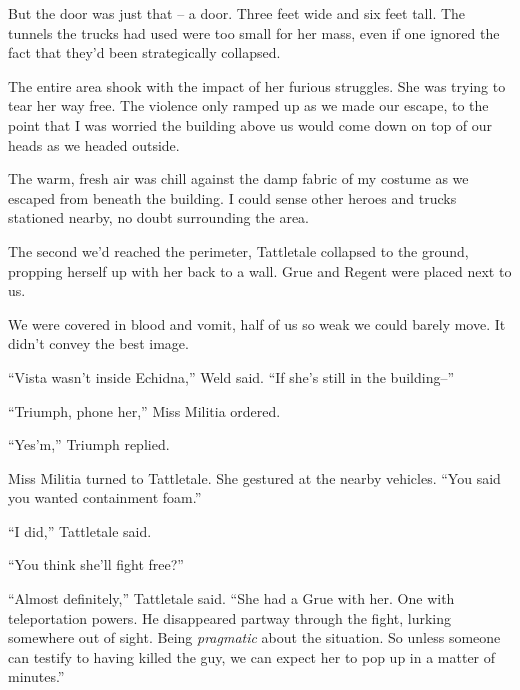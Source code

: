 But the door was just that – a door.  Three feet wide and six feet tall.  The tunnels the trucks had used were too small for her mass, even if one ignored the fact that they'd been strategically collapsed.



The entire area shook with the impact of her furious struggles.  She was trying to tear her way free.  The violence only ramped up as we made our escape, to the point that I was worried the building above us would come down on top of our heads as we headed outside.



The warm, fresh air was chill against the damp fabric of my costume as we escaped from beneath the building.  I could sense other heroes and trucks stationed nearby, no doubt surrounding the area.



The second we'd reached the perimeter, Tattletale collapsed to the ground, propping herself up with her back to a wall.  Grue and Regent were placed next to us.



We were covered in blood and vomit, half of us so weak we could barely move.  It didn't convey the best image.



``Vista wasn't inside Echidna,'' Weld said.  ``If she's still in the building--''



``Triumph, phone her,'' Miss Militia ordered.



``Yes'm,'' Triumph replied.



Miss Militia turned to Tattletale.  She gestured at the nearby vehicles.  ``You said you wanted containment foam.''



``I did,'' Tattletale said.



``You think she'll fight free?''



``Almost definitely,'' Tattletale said.  ``She had a Grue with her.  One with teleportation powers.  He disappeared partway through the fight, lurking somewhere out of sight.  Being \emph{pragmatic} about the situation.  So unless someone can testify to having killed the guy, we can expect her to pop up in a matter of minutes.''



